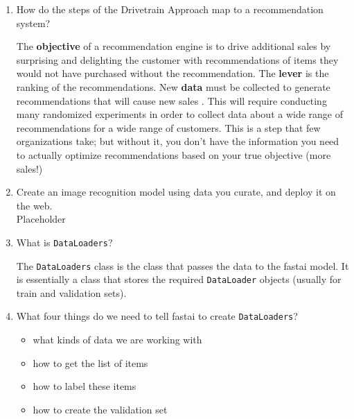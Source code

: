 \documentclass[12pt,a4paper]{article}
\begin{document}
\begin{enumerate}
\bigbreak

\item How do the steps of the Drivetrain Approach map to a recommendation system? \\

\smallbreak

The \textbf{objective} of a recommendation engine is to drive additional sales by surprising and delighting the customer with recommendations of items they would not have purchased without the recommendation. The \textbf{lever} is the ranking of the recommendations. New \textbf{data} must be collected to generate recommendations that will cause new sales . This will require conducting many randomized experiments in order to collect data about a wide range of recommendations for a wide range of customers. This is a step that few organizations take; but without it, you don’t have the information you need to actually optimize recommendations based on your true objective (more sales!)

\bigbreak

\item Create an image recognition model using data you curate, and deploy it on the web. \\

Placeholder

\item What is \verb/DataLoaders/? \\

\smallbreak

The \verb/DataLoaders/ class is the class that passes the data to the fastai model. It is essentially a class that stores the required \verb/DataLoader/ objects (usually for train and validation sets).

\bigbreak

\item What four things do we need to tell fastai to create \verb/DataLoaders/? \\

\smallbreak

\begin{itemize}
\item what kinds of data we are working with
\item how to get the list of items
\item how to label these items
\item how to create the validation set
\end{itemize}

\bigbreak


\end{enumerate}
\end{document}
